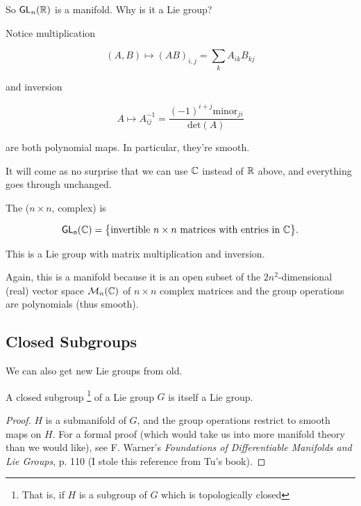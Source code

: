\documentclass[../main.tex]{subfiles}
\begin{document}
So $\mathsf{GL}_n(\mathbb{R})$ is a manifold. Why is it a Lie group?

Notice multiplication

\[
  (A,B) \mapsto (AB)_{i,j} = \sum_k A_{ik} B_{kj}
\]

and inversion

\[
  A \mapsto A^{-1}_{ij} = \frac{(-1)^{i+j} \text{minor}_{ji}}{\text{det}(A)}
\]

are both polynomial maps. In particular, they're smooth.



\bigskip

It will come as no surprise that we can use $\mathbb{C}$ instead of $\mathbb{R}$ above, and
everything goes through unchanged.

\begin{defn}
  The ($n \times n$, complex)  is

  \[
    \mathsf{GL_n}(\mathbb{C}) = \big \{ \text{invertible $n \times n$ matrices with entries in $\mathbb{C}$} \big \}.
  \]

  This is a Lie group with matrix multiplication and inversion.
\end{defn}

Again, this is a manifold because it is an open subset of the $2n^2$-dimensional
(real) vector space $\mathcal{M}_n(\mathbb{C})$ of $n \times n$ complex matrices and
the group operations are polynomials (thus smooth).

\subsection{Closed Subgroups}

We can also get new Lie groups from old.

\begin{thm}
  A closed subgroup%
  \footnote{That is, if $H$ is a subgroup of $G$ which is topologically closed} 
  of a Lie group $G$ is itself a Lie group.
\end{thm}

\begin{proof}
  $H$ is a submanifold of $G$, and the group operations restrict to smooth
  maps on $H$. For a formal proof (which would take us into more manifold 
  theory than we would like), see F. Warner's 
  \emph{Foundations of Differentiable Manifolds and Lie Groups}, p. 110
  (I stole this reference from Tu's book).
\end{proof}
\end{document}
